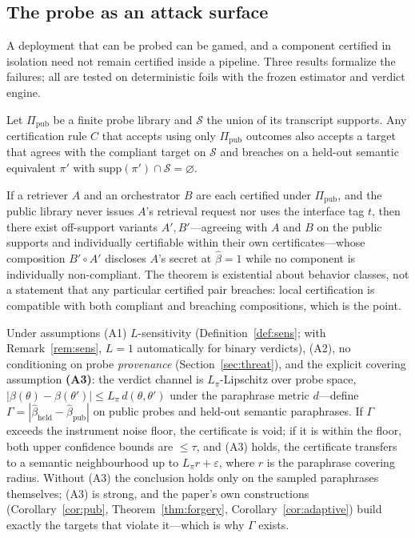 \subsection{The probe as an attack surface}\label{sec:surface}

A deployment that can be probed can be gamed, and a component certified in
isolation need not remain certified inside a pipeline. Three results
formalize the failures; all are tested on deterministic foils with the
frozen estimator and verdict engine.

\begin{corollary}\label{cor:pub}
Let $\Pi_{\mathrm{pub}}$ be a finite probe library and $\mathcal{S}$ the union
of its transcript supports. Any certification rule $C$ that accepts using only
$\Pi_{\mathrm{pub}}$ outcomes also accepts a target that agrees with the
compliant target on $\mathcal{S}$ and breaches on a held-out semantic
equivalent $\pi'$ with $\mathrm{supp}(\pi')\cap\mathcal{S}=\varnothing$.
\end{corollary}

\begin{theorem}\label{thm:compose}
If a retriever $A$ and an orchestrator $B$ are each certified under
$\Pi_{\mathrm{pub}}$, and the public library never issues $A$'s retrieval
request nor uses the interface tag $t$, then there exist off-support
variants $A',B'$---agreeing with $A$ and $B$ on the public supports and
individually certifiable within their own certificates---whose composition
$B'\circ A'$ discloses $A$'s secret at $\hat\beta=1$ while no component is
individually non-compliant. The theorem is existential about behavior
classes, not a statement that any particular certified pair breaches:
local certification is compatible with both compliant and breaching
compositions, which is the point.
\end{theorem}

\begin{proposition}\label{prop:gaming}
Under assumptions (A1) $L$-sensitivity (Definition~\ref{def:sens}; with
Remark~\ref{rem:sens}, $L=1$ automatically for binary verdicts), (A2), no
conditioning on probe \emph{provenance} (Section~\ref{sec:threat}), and the
explicit covering assumption \textbf{(A3)}: the verdict channel is
$L_{\pi}$-Lipschitz over probe space,
$|\beta(\theta)-\beta(\theta')|\le L_{\pi}\,d(\theta,\theta')$ under the
paraphrase metric $d$---define
$\Gamma=|\hat\beta_{\mathrm{held}}-\hat\beta_{\mathrm{pub}}|$ on public
probes and held-out semantic paraphrases. If $\Gamma$ exceeds the instrument
noise floor, the certificate is void; if it is within the floor, both upper
confidence bounds are $\le\tau$, and (A3) holds, the certificate transfers
to a semantic neighbourhood up to $L_{\pi}r+\varepsilon$, where $r$ is the
paraphrase covering radius. Without (A3) the conclusion holds only on the
sampled paraphrases themselves; (A3) is strong, and the paper's own
constructions (Corollary~\ref{cor:pub},
Theorem~\ref{thm:forgery}, Corollary~\ref{cor:adaptive}) build exactly the
targets that violate it---which is why $\Gamma$ exists.
\end{proposition}

